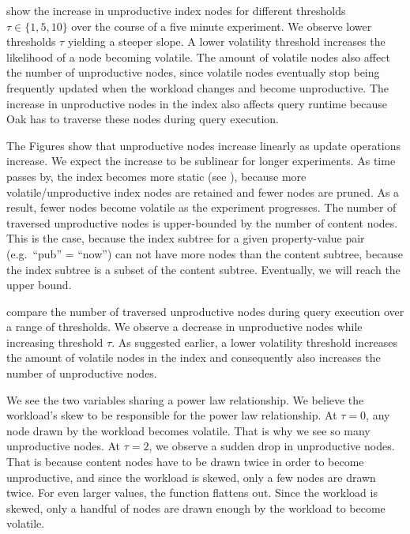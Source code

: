 \documentclass[abstracton,12pt]{scrartcl}
\theoremstyle{definition}
\begin{document}
show the increase in unproductive index nodes for different
thresholds $\tau \in \{1,5,10\}$ over the course of a five minute experiment.
We observe lower thresholds $\tau$ yielding a steeper slope.
A lower volatility threshold increases the likelihood of a node
becoming volatile. The amount of volatile nodes also affect the number of
unproductive nodes, since volatile nodes eventually stop being frequently
updated when the workload changes and become unproductive. 
The increase in unproductive nodes in the index
also affects query runtime because Oak has to traverse these nodes during
query execution.

The Figures show that unproductive nodes increase linearly as update operations
increase. We expect the increase to be sublinear for longer experiments.
As time passes by, the index becomes more static (see ), 
because more volatile/unproductive
index nodes are retained and fewer nodes are pruned. As a result, fewer nodes
become volatile as the experiment progresses.
The number of traversed unproductive nodes is upper-bounded by the number 
of content nodes.
This is the case, because the index subtree for a given property-value pair
(e.g.\ ``pub'' = ``now'') can not have
more nodes than the content subtree, because the index subtree is a subset
of the content subtree.
Eventually, we will reach the upper bound.

 compare the
number of traversed unproductive nodes during query execution over a range of
thresholds. We observe a decrease in unproductive nodes while increasing
threshold $\tau$. 
As suggested earlier, a lower volatility threshold
increases the amount of volatile nodes in the index and consequently also
increases the number of unproductive nodes. 

We see the two variables sharing a power law relationship. We believe the
workload's skew to be responsible for the power law relationship. 
At $\tau = 0$, any node drawn by the workload becomes volatile. That is why we
see so many unproductive nodes. At $\tau = 2$, we observe a sudden drop in 
unproductive nodes. That is because content nodes have to be drawn twice in order
to become unproductive, and since the workload is skewed, only a few nodes are
drawn twice. For even larger values, the function flattens out. Since the workload
is skewed, only a handful of nodes are drawn enough by the workload to become volatile.
\end{document}
